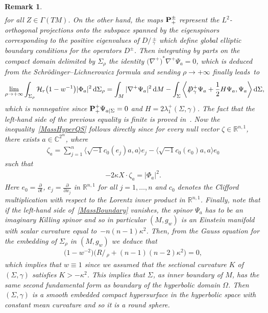 \documentclass[10pt,a4paper]{amsart}
\numberwithin{equation}{section}
\newtheorem{Remark}[Theorem]{Remark}
\def\Paps{{\bf P}_+}
\def\Ss{R\!\!\!\!/\,}
\def\D{D\!\!\!\!/\,}
\begin{document}
\begin{Remark}
\begin{gather*}
\end{gather*}
for all $Z\in\Gamma(TM)$. On the other hand, the maps $\Paps^\pm$ represent the $L^2$-orthogonal projections onto the subspace spanned by the eigenspinors corresponding to the positive eigenvalues of $\D_\gamma^\pm$ which define global elliptic boundary conditions for the operators $D^\pm$. Then integrating by parts on the compact domain delimited by $\Sigma_\rho$ the identity
$
\big(\nabla^+\big)^*\nabla^+\Psi_a=0$,
which is deduced from the Schr\"odinger--Lichnerowicz formula and sending $\rho\rightarrow+\infty$ finally leads~to
\begin{gather}\label{MassBoundary}
\lim_{\rho\rightarrow+\infty}\int_{\Sigma_\rho}\mathcal{H}_r\big(1-w^{-1}\big)|\Phi_a|^2\,{\rm d}\Sigma_{\rho} =\int_M|\nabla^+\Psi_a|^2\,{\rm d}M-\int_\Sigma\bigg\langle \D^+_\gamma\Psi_a+\frac{1}{2}H\Psi_a,\Psi_a\bigg\rangle \,{\rm d}\Sigma,\!\!\!
\end{gather}
which is nonnegative since $\Paps^+\Psi_{a|\Sigma}=0$ and $H=2\lambda^+_1(\Sigma,\gamma)$. The fact that the left-hand side of the previous equality is finite is proved in~\cite{Kwong1, WangYau0}. Now the inequality~\eqref{MassHyperQS} follows directly since for every null vector $\zeta\in\mathbb{R}^{n,1}$, there exists $a\in\mathbb{C}^{2^m}$, where
\begin{gather*}
\zeta_a=\sum_{j=1}^n\big\langle \sqrt{-1}c_0(e_j)a,a\big\rangle e_j-\big\langle \sqrt{-1}c_0(e_0)a,a\big\rangle e_0
\end{gather*}
such that
\begin{gather*}
-2\kappa X\cdot\zeta_a=|\Phi_a|^2.
\end{gather*}
Here $e_0=\frac{\partial}{\partial t}$, $e_j=\frac{\partial}{\partial x_j}$ in $\mathbb{R}^{n,1}$ for all $j=1,\dots,n$ and $c_0$ denotes the Clifford multiplication with respect to the Lorentz inner product in $\mathbb{R}^{n,1}$. Finally, note that if the left-hand side of~\eqref{MassBoundary} vanishes, the spinor $\Psi_a$ has to be an imaginary Killing spinor and so in particular $(M,g_w)$ is an Einstein manifold with scalar curvature equal to~$-n(n-1)\kappa^2$. Then, from the Gauss equation for the embedding of $\Sigma_\rho$ in $(M,g_w)$ we deduce that
\begin{gather*}
\big(1-w^{-2}\big)\big(\Ss_\rho+(n-1)(n-2)\kappa^2\big)=0,
\end{gather*}
which implies that $w\equiv 1$ since we assumed that the sectional curvature $K$ of $(\Sigma,\gamma)$ satisfies $K>-\kappa^2$. This implies that $\Sigma$, as inner boundary of $M$, has the same second fundamental form as boundary of the hyperbolic domain $\Omega$. Then $(\Sigma,\gamma)$ is a smooth embedded compact hypersurface in the hyperbolic space with constant mean curvature and so it is a round sphere.
\end{Remark}
\end{document}
